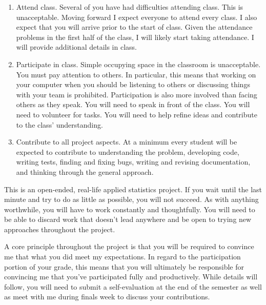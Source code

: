 \documentclass[11pt, oneside]{article}   	%
\begin{document}
\begin{enumerate}
\item Attend class.  Several of you have had difficulties attending class.
  This is unacceptable.  Moving forward I expect everyone to attend every
  class.  I also expect that you will arrive prior to the start of class.
  Given the attendance problems in the first half of the class, I will likely
  start taking attendance.  I will provide additional details in class.
\item Participate in class.  Simple occupying space in the classroom is
  unacceptable.  You must pay attention to others.  In particular, this
  means that working on your computer when you should be listening to
  others or discussing things with your team is prohibited.  Participation
  is also more involved than facing others as they speak.  You will need
  to speak in front of the class.  You will need to volunteer for tasks.
  You will need to help refine ideas and contribute to the class' understanding. 
\item Contribute to all project aspects.  At a minimum every student will
  be expected to contribute to understanding the problem, developing code,
  writing tests, finding and fixing bugs, writing and revising documentation, and
  thinking through the general approach.
\end{enumerate}

This is an open-ended, real-life applied statistics project.  If you wait until
the last minute and try to do as little as possible, you will not succeed.  As
with anything worthwhile, you will have to work constantly and thoughtfully.
You will need to be able to discard work that doesn't lead anywhere and be open
to trying new approaches throughout the project.

A core principle throughout the project is that you will be required to convince
me that what you did meet my expectations.  In regard to the participation portion
of your grade, this means that you will ultimately be responsible for convincing
me that you've participated fully and productively.  While details will follow,
you will need to submit a self-evaluation at the end of the semester as well
as meet with me during finals week to discuss your contributions.
\end{document}
